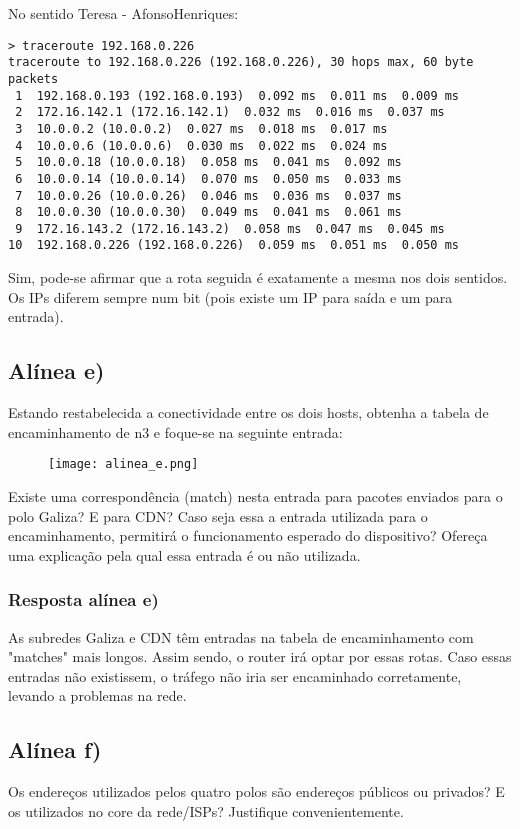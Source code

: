 \documentclass{article}
\begin{document}
No sentido Teresa - AfonsoHenriques:
\begin{lstlisting}
> traceroute 192.168.0.226
traceroute to 192.168.0.226 (192.168.0.226), 30 hops max, 60 byte packets
 1  192.168.0.193 (192.168.0.193)  0.092 ms  0.011 ms  0.009 ms
 2  172.16.142.1 (172.16.142.1)  0.032 ms  0.016 ms  0.037 ms
 3  10.0.0.2 (10.0.0.2)  0.027 ms  0.018 ms  0.017 ms
 4  10.0.0.6 (10.0.0.6)  0.030 ms  0.022 ms  0.024 ms
 5  10.0.0.18 (10.0.0.18)  0.058 ms  0.041 ms  0.092 ms
 6  10.0.0.14 (10.0.0.14)  0.070 ms  0.050 ms  0.033 ms
 7  10.0.0.26 (10.0.0.26)  0.046 ms  0.036 ms  0.037 ms
 8  10.0.0.30 (10.0.0.30)  0.049 ms  0.041 ms  0.061 ms
 9  172.16.143.2 (172.16.143.2)  0.058 ms  0.047 ms  0.045 ms
10  192.168.0.226 (192.168.0.226)  0.059 ms  0.051 ms  0.050 ms
\end{lstlisting}

Sim, pode-se afirmar que a rota seguida é exatamente a mesma nos dois sentidos. Os IPs diferem sempre num bit (pois existe um IP para saída e um para entrada).

\subsection{Alínea e)}
Estando restabelecida a conectividade entre os dois hosts, obtenha a tabela de encaminhamento de n3 e
foque-se na seguinte entrada:
\begin{figure}[h]
    \centering
    \texttt{[image: alinea\_e.png]}
\end{figure}

Existe uma correspondência (match) nesta entrada para pacotes enviados para o polo Galiza? E para CDN?
Caso seja essa a entrada utilizada para o encaminhamento, permitirá o funcionamento esperado do
dispositivo?
Ofereça uma explicação pela qual essa entrada é ou não utilizada.

\subsubsection{Resposta alínea e)}

As subredes Galiza e CDN têm entradas na tabela de encaminhamento com "matches" mais longos. Assim sendo, o router irá optar por essas rotas. Caso essas entradas não existissem, o tráfego não iria ser encaminhado corretamente, levando a problemas na rede.

\subsection{Alínea f)}
Os endereços utilizados pelos quatro polos são endereços públicos ou privados? E os utilizados no core da
rede/ISPs? Justifique convenientemente.
\end{document}
